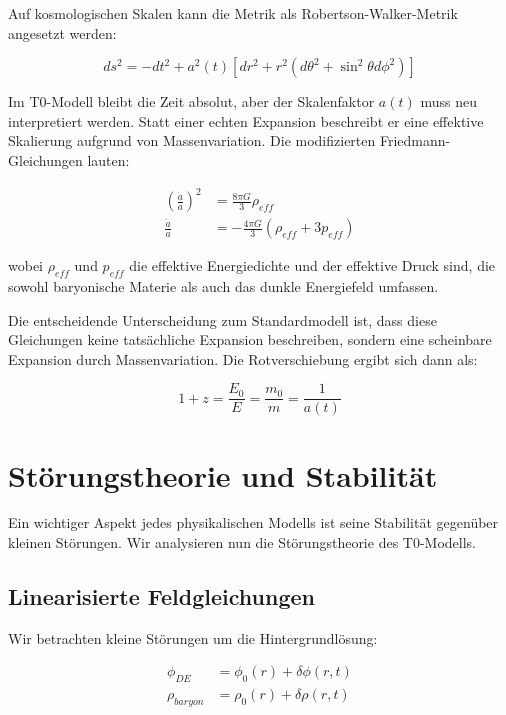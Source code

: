 \documentclass[a4paper,12pt]{article}
\begin{document}
	Auf kosmologischen Skalen kann die Metrik als Robertson-Walker-Metrik angesetzt werden:
	
	\begin{equation}
	ds^2 = -dt^2 + a^2(t)[dr^2 + r^2(d\theta^2 + \sin^2\theta d\phi^2)]
	\end{equation}
	
	Im T0-Modell bleibt die Zeit absolut, aber der Skalenfaktor $a(t)$ muss neu interpretiert werden. Statt einer echten Expansion beschreibt er eine effektive Skalierung aufgrund von Massenvariation. Die modifizierten Friedmann-Gleichungen lauten:
	
	\begin{align}
	\left(\frac{\dot{a}}{a}\right)^2 &= \frac{8\pi G}{3}\rho_{eff}\\
	\frac{\ddot{a}}{a} &= -\frac{4\pi G}{3}(\rho_{eff} + 3p_{eff})
	\end{align}
	
	wobei $\rho_{eff}$ und $p_{eff}$ die effektive Energiedichte und der effektive Druck sind, die sowohl baryonische Materie als auch das dunkle Energiefeld umfassen.
	
	Die entscheidende Unterscheidung zum Standardmodell ist, dass diese Gleichungen keine tatsächliche Expansion beschreiben, sondern eine scheinbare Expansion durch Massenvariation. Die Rotverschiebung ergibt sich dann als:
	
	\begin{equation}
	1 + z = \frac{E_0}{E} = \frac{m_0}{m} = \frac{1}{a(t)}
	\end{equation}
	
	\section{Störungstheorie und Stabilität}
	
	Ein wichtiger Aspekt jedes physikalischen Modells ist seine Stabilität gegenüber kleinen Störungen. Wir analysieren nun die Störungstheorie des T0-Modells.
	
	\subsection{Linearisierte Feldgleichungen}
	
	Wir betrachten kleine Störungen um die Hintergrundlösung:
	
	\begin{align}
	\phi_{DE} &= \phi_0(r) + \delta\phi(r,t)\\
	\rho_{baryon} &= \rho_0(r) + \delta\rho(r,t)
	\end{align}
	
\end{document}
